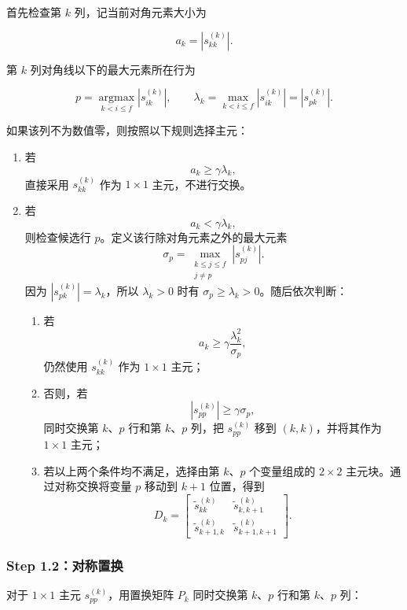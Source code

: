 首先检查第 $k$ 列，记当前对角元素大小为

\[
a_k=\left|s_{kk}^{(k)}\right|.
\]

第 $k$ 列对角线以下的最大元素所在行为

\[
p=\underset{k<i\le f}{\operatorname{argmax}}
  \left|s_{ik}^{(k)}\right|,
\qquad
\lambda_k=\max_{k<i\le f}\left|s_{ik}^{(k)}\right|
=\left|s_{pk}^{(k)}\right|.
\]

如果该列不为数值零，则按照以下规则选择主元：

\begin{enumerate}
  \item 若
  \[
  a_k\ge\gamma\lambda_k,
  \]
  直接采用 $s_{kk}^{(k)}$ 作为 $1\times1$ 主元，不进行交换。

  \item 若
  \[
  a_k<\gamma\lambda_k,
  \]
  则检查候选行 $p$。定义该行除对角元素之外的最大元素
  \[
  \sigma_p=
  \max_{\substack{k\le j\le f\\j\ne p}}
  \left|s_{pj}^{(k)}\right|.
  \]
  因为 $|s_{pk}^{(k)}|=\lambda_k$，所以 $\lambda_k>0$ 时有 $\sigma_p\ge\lambda_k>0$。随后依次判断：
  \begin{enumerate}[label=(\alph*)]
    \item 若
    \[
    a_k\ge\gamma\frac{\lambda_k^2}{\sigma_p},
    \]
    仍然使用 $s_{kk}^{(k)}$ 作为 $1\times1$ 主元；

    \item 否则，若
    \[
    \left|s_{pp}^{(k)}\right|\ge\gamma\sigma_p,
    \]
    同时交换第 $k$、$p$ 行和第 $k$、$p$ 列，把 $s_{pp}^{(k)}$ 移到 $(k,k)$，并将其作为 $1\times1$ 主元；

    \item 若以上两个条件均不满足，选择由第 $k$、$p$ 个变量组成的 $2\times2$ 主元块。通过对称交换将变量 $p$ 移动到 $k+1$ 位置，得到
    \[
    D_k=
    \begin{bmatrix}
    \widetilde s_{kk}^{(k)}&\widetilde s_{k,k+1}^{(k)}\\
    \widetilde s_{k+1,k}^{(k)}&\widetilde s_{k+1,k+1}^{(k)}
    \end{bmatrix}.
    \]
  \end{enumerate}
\end{enumerate}

\subsubsection{Step 1.2：对称置换}

对于 $1\times1$ 主元 $s_{pp}^{(k)}$，用置换矩阵 $P_k$ 同时交换第 $k$、$p$ 行和第 $k$、$p$ 列：

